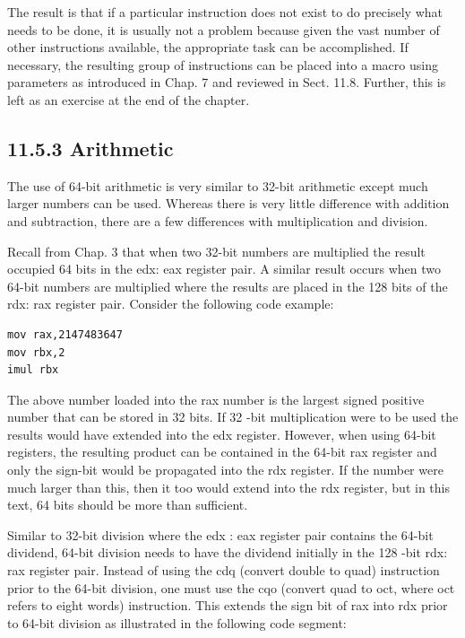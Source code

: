 \documentclass[10pt]{book}
\begin{document}
The result is that if a particular instruction does not exist to do precisely what needs to be done, it is usually not a problem because given the vast number of other instructions available, the appropriate task can be accomplished. If necessary, the resulting group of instructions can be placed into a macro using parameters as introduced in Chap. 7 and reviewed in Sect. 11.8. Further, this is left as an exercise at the end of the chapter.

\subsection*{11.5.3 Arithmetic}
The use of 64-bit arithmetic is very similar to 32-bit arithmetic except much larger numbers can be used. Whereas there is very little difference with addition and subtraction, there are a few differences with multiplication and division.

Recall from Chap. 3 that when two 32-bit numbers are multiplied the result occupied 64 bits in the edx: eax register pair. A similar result occurs when two 64-bit numbers are multiplied where the results are placed in the 128 bits of the rdx: rax register pair. Consider the following code example:

\begin{verbatim}
mov rax,2147483647
mov rbx,2
imul rbx
\end{verbatim}

The above number loaded into the rax number is the largest signed positive number that can be stored in 32 bits. If 32 -bit multiplication were to be used the results would have extended into the edx register. However, when using 64-bit registers, the resulting product can be contained in the 64-bit rax register and only the sign-bit would be propagated into the rdx register. If the number were much larger than this, then it too would extend into the rdx register, but in this text, 64 bits should be more than sufficient.

Similar to 32-bit division where the edx : eax register pair contains the 64-bit dividend, 64-bit division needs to have the dividend initially in the 128 -bit rdx:\\
rax register pair. Instead of using the cdq (convert double to quad) instruction prior to the 64-bit division, one must use the cqo (convert quad to oct, where oct refers to eight words) instruction. This extends the sign bit of rax into rdx prior to 64-bit division as illustrated in the following code segment:
\end{document}
